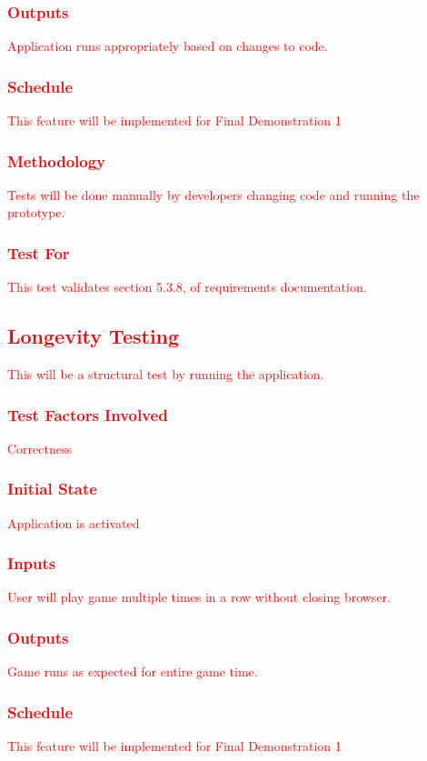 \documentclass[11pt, oneside]{article}   	%
\begin{document}
\subsubsection{\textcolor{red}{Outputs}}
\textcolor{red}{Application runs appropriately based on changes to code.}
\subsubsection{\textcolor{red}{Schedule}}
\textcolor{red}{This feature will be implemented for Final Demonstration 1}
\subsubsection{\textcolor{red}{Methodology}}
\textcolor{red}{Tests will be done manually by developers changing code and running the prototype.}
\subsubsection{\textcolor{red}{Test For}}
\textcolor{red}{This test validates section 5.3.8, of requirements documentation.}


\subsection{\textcolor{red}{Longevity Testing}}
\textcolor{red}{This will be a structural test by running the application.}
\subsubsection{\textcolor{red}{Test Factors Involved}}
\textcolor{red}{Correctness}
\subsubsection{\textcolor{red}{Initial State}}
\textcolor{red}{Application is activated}
\subsubsection{\textcolor{red}{Inputs}}
\textcolor{red}{User will play game multiple times in a row without closing browser.}
\subsubsection{\textcolor{red}{Outputs}}
\textcolor{red}{Game runs as expected for entire game time.}
\subsubsection{\textcolor{red}{Schedule}}
\textcolor{red}{This feature will be implemented for Final Demonstration 1}
\end{document}
